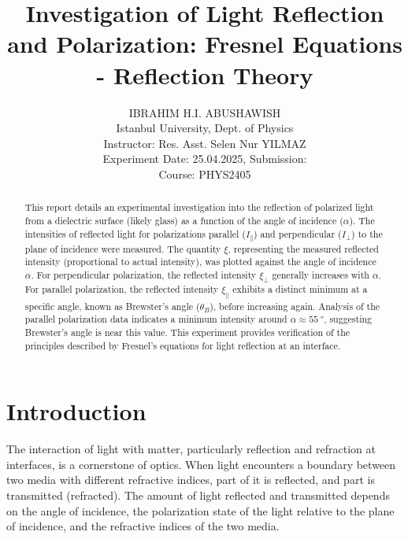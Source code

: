 \documentclass[journal]{IEEEtran}
\begin{document}
\title{Investigation of Light Reflection and Polarization: Fresnel Equations - Reflection Theory}
\author{{\large IBRAHIM H.I. ABUSHAWISH} \\ %
{\small Istanbul University, Dept. of Physics \\ 
Instructor: Res. Asst. Selen Nur YILMAZ \\ 
Experiment Date: 25.04.2025, Submission: \\ 
Course: PHYS2405}}


\maketitle

\begin{abstract}
    This report details an experimental investigation into the reflection of polarized light from a dielectric surface (likely glass) as a function of the angle of incidence ($\alpha$). The intensities of reflected light for polarizations parallel ($I_{\parallel}$) and perpendicular ($I_{\perp}$) to the plane of incidence were measured. The quantity $\xi$, representing the measured reflected intensity (proportional to actual intensity), was plotted against the angle of incidence $\alpha$. For perpendicular polarization, the reflected intensity $\xi_{\perp}$ generally increases with $\alpha$. For parallel polarization, the reflected intensity $\xi_{\parallel}$ exhibits a distinct minimum at a specific angle, known as Brewster's angle ($\theta_B$), before increasing again. Analysis of the parallel polarization data indicates a minimum intensity around $\alpha \approx \SI{55}{\degree}$, suggesting Brewster's angle is near this value. This experiment provides verification of the principles described by Fresnel's equations for light reflection at an interface.
\end{abstract}
 

\section{Introduction}
The interaction of light with matter, particularly reflection and refraction at interfaces, is a cornerstone of optics. When light encounters a boundary between two media with different refractive indices, part of it is reflected, and part is transmitted (refracted). The amount of light reflected and transmitted depends on the angle of incidence, the polarization state of the light relative to the plane of incidence, and the refractive indices of the two media.
\end{document}
